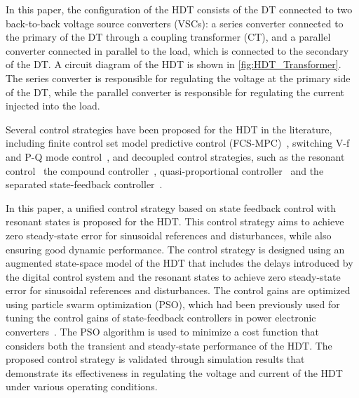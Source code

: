 In this paper, the configuration of the HDT consists of the DT connected to two back-to-back voltage source converters (VSCs): a series converter connected to the primary of the DT through a coupling transformer (CT), and a parallel converter connected in parallel to the load, which is connected to the secondary of the DT. A circuit diagram of the HDT is shown in \cref{fig:HDT_Transformer}. The series converter is responsible for regulating the voltage at the primary side of the DT, while the parallel converter is responsible for regulating the current injected into the load.

Several control strategies have been proposed for the HDT in the literature, including finite control set model predictive control (FCS-MPC)~\cite{costaFourlegMatrixConverter2022}, switching V-f and P-Q mode control~\cite{xuThreePhaseHybridTransformer2023}, and decoupled control strategies, such as the resonant control~\cite{matelskiBadaniaEksperymentalneTransformatora2023} the compound controller~\cite{liuCompoundControlSystem2020}, quasi-proportional controller~\cite{liuQuasiProportionalResonantControlHybrid2022} and the separated state-feedback controller~\cite{carrenoStateFeedbackControlHybrid2024}.

In this paper, a unified control strategy based on state feedback control with resonant states is proposed for the HDT. This control strategy aims to achieve zero steady-state error for sinusoidal references and disturbances, while also ensuring good dynamic performance. The control strategy is designed using an augmented state-space model of the HDT that includes the delays introduced by the digital control system and the resonant states to achieve zero steady-state error for sinusoidal references and disturbances. The control gains are optimized using particle swarm optimization (PSO), which had been previously used for tuning the control gains of state-feedback controllers in power electronic converters~\cite{ufnalskiParticleSwarmOptimization2015}. The PSO algorithm is used  to minimize a cost function that considers both the transient and steady-state performance of the HDT. The proposed control strategy is validated through simulation results that demonstrate its effectiveness in regulating the voltage and current of the HDT under various operating conditions.